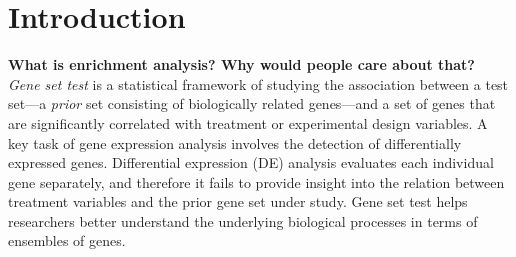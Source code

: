 \documentclass[a4,center,fleqn]{NAR}
\begin{document}
%	
%	
	
	\section{Introduction}\label{section:introduction}
	
	\textbf{What is enrichment analysis? Why would people care about that?}\\
	\textit{Gene set test} is a statistical framework of studying the association between a test
	set---a \textit{prior} set consisting of biologically related genes---and a set of genes that are
	significantly correlated with treatment or experimental design variables. A key task of gene
	expression analysis involves the detection of differentially expressed genes. Differential
	expression (DE) analysis  evaluates each individual gene separately, and therefore it fails to
	provide insight into the relation between treatment variables and the prior gene set under study.
	Gene set test helps researchers better understand the underlying biological processes in terms of
	ensembles of genes.
	
\end{document}
